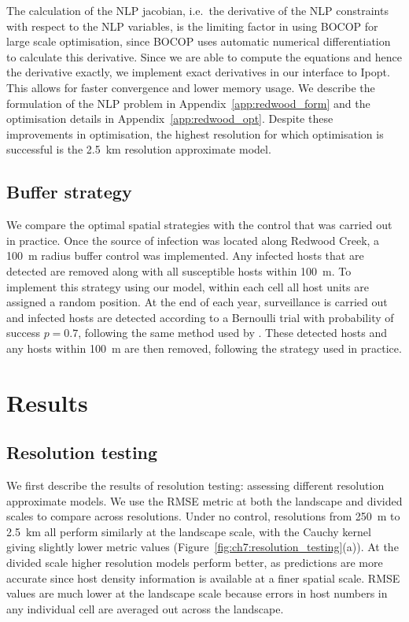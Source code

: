 The calculation of the NLP jacobian, i.e.\ the derivative of the NLP constraints with respect to the NLP variables, is the limiting factor in using BOCOP for large scale optimisation, since BOCOP uses automatic numerical differentiation to calculate this derivative. Since we are able to compute the equations and hence the derivative exactly, we implement exact derivatives in our interface to Ipopt. This allows for faster convergence and lower memory usage. We describe the formulation of the NLP problem in Appendix~\ref{app:redwood_form} and the optimisation details in Appendix~\ref{app:redwood_opt}. Despite these improvements in optimisation, the highest resolution for which optimisation is successful is the \SI{2.5}{\km} resolution approximate model.

\subsection{Buffer strategy}

We compare the optimal spatial strategies with the control that was carried out in practice. Once the source of infection was located along Redwood Creek, a \SI{100}{\meter} radius buffer control was implemented. Any infected hosts that are detected are removed along with all susceptible hosts within \SI{100}{\meter}. To implement this strategy using our model, within each cell all host units are assigned a random position. At the end of each year, surveillance is carried out and infected hosts are detected according to a Bernoulli trial with probability of success $p=0.7$, following the same method used by \citet{cunniffe_modelling_2016}. These detected hosts and any hosts within \SI{100}{\meter} are then removed, following the strategy used in practice.

\section{Results}

\subsection{Resolution testing}

We first describe the results of resolution testing: assessing different resolution approximate models. We use the RMSE metric at both the landscape and divided scales to compare across resolutions. Under no control, resolutions from \SI{250}{\meter} to \SI{2.5}{\km} all perform similarly at the landscape scale, with the Cauchy kernel giving slightly lower metric values (Figure~\ref{fig:ch7:resolution_testing}(a)). At the divided scale higher resolution models perform better, as predictions are more accurate since host density information is available at a finer spatial scale. RMSE values are much lower at the landscape scale because errors in host numbers in any individual cell are averaged out across the landscape.

